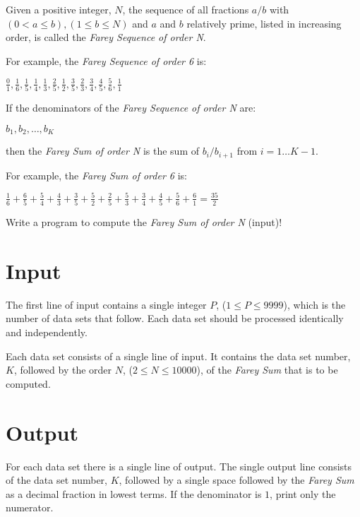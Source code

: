 
\noindent
Given a positive integer, $N$, the sequence of all fractions $a / b$ with
$(0 < a \le b), (1 \le b \le N)$ and $a$ and $b$ relatively prime,
listed in increasing order, is called the \emph{Farey Sequence of order N}.

\noindent
For example, the \emph{Farey Sequence of order 6} is:

\begin{center}
    $\frac{0}{1}, 
     \frac{1}{6},
     \frac{1}{5},
     \frac{1}{4},
     \frac{1}{3},
     \frac{2}{5},
     \frac{1}{2},
     \frac{3}{5},
     \frac{2}{3},
     \frac{3}{4},
     \frac{4}{5},
     \frac{5}{6},
     \frac{1}{1}
    $
\end{center}

If the denominators of the \emph{Farey Sequence of order N} are:

\begin{center}
$b_1, b_2, \ldots, b_K$
\end{center}

then the \emph{Farey Sum of order N} is the sum of $b_i / b_{i+1}$ from $i = 1 \ldots K-1$.

For example, the \emph{Farey Sum of order 6} is:

\begin{center}
$\frac{1}{6}
+\frac{6}{5}
+\frac{5}{4}
+\frac{4}{3}
+\frac{3}{5}
+\frac{5}{2}
+\frac{2}{5}
+\frac{5}{3}
+\frac{3}{4}
+\frac{4}{5}
+\frac{5}{6}
+\frac{6}{1}
=
\frac{35}{2}
$
\end{center}

Write a program to compute the \emph{Farey Sum of order N} (input)!

\section*{Input}

The first line of input contains a single integer $P$, ($1 \le P \le 9999$),
which is the number of data sets that follow.  Each data set should be
processed identically and independently.

Each data set consists of a single line of input.  It contains the data
set number, $K$, followed by the order $N$, ($2 \le N \le 10000$), of the
\emph{Farey Sum} that is to be computed.

\section*{Output}

For each data set there is a single line of output.  The single output
line consists of the data set number, $K$, followed by a single space
followed by the \emph{Farey Sum} as a decimal fraction in lowest terms.  If the
denominator is $1$, print only the numerator.

